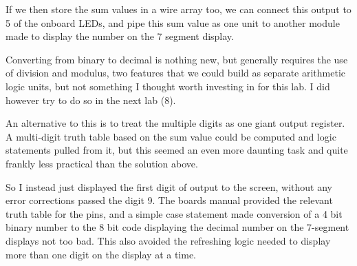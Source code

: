 \documentclass[prb,preprint]{revtex4-1}
\begin{document}
If we then store the sum values in a wire array too, we can connect this output to 5 of the onboard LEDs, and pipe this sum value as one unit to another module made to display the number on the 7 segment display.

Converting from binary to decimal is nothing new, but generally requires the use of division and modulus, two features that we could build as separate arithmetic logic units, but not something I thought worth investing in for this lab. I did however try to do so in the next lab (8).

An alternative to this is to treat the multiple digits as one giant output register. A multi-digit truth table based on the sum value could be computed and logic statements pulled from it, but this seemed an even more daunting task and quite frankly less practical than the solution above.

So I instead just displayed the first digit of output to the screen, without any error corrections passed the digit 9. The boards manual provided the relevant truth table for the pins, and a simple case statement made conversion of a 4 bit binary number to the 8 bit code displaying the decimal number on the 7-segment displays not too bad. This also avoided the refreshing logic needed to display more than one digit on the display at a time.



\end{document}
